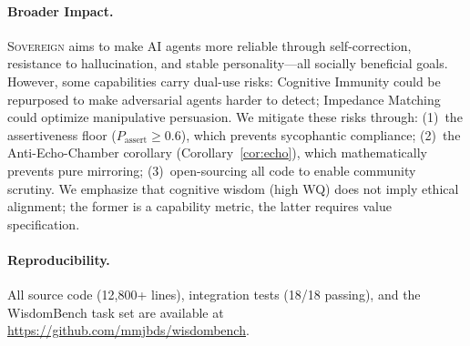 \documentclass[11pt,a4paper]{article}
\begin{document}
\paragraph{Broader Impact.}
\textsc{Sovereign} aims to make AI agents more reliable through self-correction, resistance to hallucination, and stable personality---all socially beneficial goals.
However, some capabilities carry dual-use risks: Cognitive Immunity could be repurposed to make adversarial agents harder to detect; Impedance Matching could optimize manipulative persuasion.
We mitigate these risks through:
(1)~the assertiveness floor ($P_{\text{assert}} \geq 0.6$), which prevents sycophantic compliance;
(2)~the Anti-Echo-Chamber corollary (Corollary~\ref{cor:echo}), which mathematically prevents pure mirroring;
(3)~open-sourcing all code to enable community scrutiny.
We emphasize that cognitive wisdom (high WQ) does not imply ethical alignment; the former is a capability metric, the latter requires value specification.

\paragraph{Reproducibility.}
All source code (12,800+ lines), integration tests (18/18 passing), and the
WisdomBench task set are available at
\url{https://github.com/mmjbds/wisdombench}.
\end{document}
